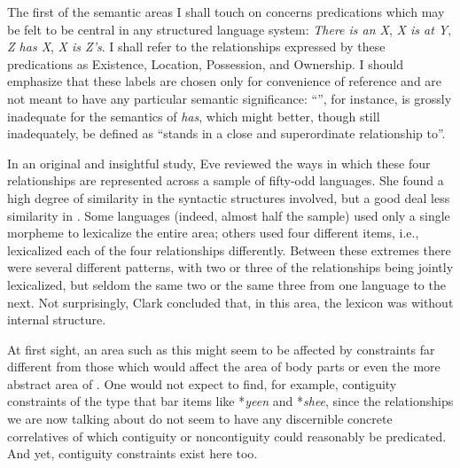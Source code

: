 The first of the semantic areas I shall touch on concerns predications which may be felt to be central in any structured language system: \textit{There is an X}, \textit{X is at Y}, \textit{Z has X}, \textit{X is Z's}. I shall refer to the relationships expressed by these predications as Existence, Location, Possession, and Ownership. I should emphasize that these labels are chosen only for convenience of reference and are not meant to have any particular semantic significance: ``'', for instance, is grossly inadequate for the semantics of \textit{has}, which might better, though still inadequately, be defined as ``stands in a close and superordinate relationship to''.

In an original and insightful study, Eve \citet{Clark1970} reviewed the ways in which these four relationships are represented across a sample of fifty-odd languages. She found a high degree of similarity in the syntactic structures involved, but a good deal less similarity in . Some languages (indeed, almost half the sample) used only a single morpheme to lexicalize the entire area; others used four different items, i.e., lexicalized each of the four relationships differently. Between these extremes there were several different patterns, with two or three of the relationships being jointly lexicalized, but seldom the same two or the same three from one language to the next. Not surprisingly, Clark concluded that, in this area, the lexicon was without internal structure.

At first sight, an area such as this might seem to be affected by constraints far different from those which would affect the area of 
body parts or even the more abstract area of . One would not expect to find, for example, contiguity constraints of the type that bar items like *\textit{yeen} and *\textit{shee}, since the relationships we are now talking about do not seem to have any discernible concrete correlatives of which contiguity or noncontiguity could reasonably be predicated. And yet, contiguity constraints exist here too. 

